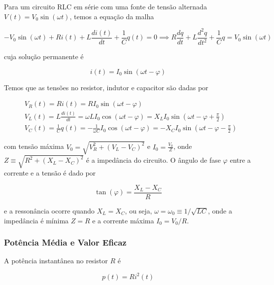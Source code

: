 \documentclass[12pt]{article}
\begin{document}
Para um circuito RLC em série com uma fonte de tensão alternada \(V(t) = V_0 \sin(\omega t)\), temos a equação da malha

\begin{equation}
    - V_0 \sin(\omega t) + R i(t) + L \frac{di(t)}{dt} + \frac{1}{C} q(t) = 0 \implies R\frac{dq}{dt} + L \frac{d^2q}{dt^2} + \frac{1}{C} q = V_0 \sin(\omega t)
\end{equation}

\noindent cuja solução permanente é

\begin{equation}
    \boxed{i(t) = I_0 \sin(\omega t - \varphi)}
\end{equation}

Temos que as tensões no resistor, indutor e capacitor são dadas por

\begin{align}
    &V_R(t) = R i(t) = R I_0 \sin(\omega t - \varphi) \\
    &V_L(t) = L \frac{di(t)}{dt} = \omega L I_0 \cos(\omega t - \varphi) = X_L I_0 \sin\left(\omega t - \varphi + \frac{\pi}{2}\right) \\
    &V_C(t) = \frac{1}{C} q(t) = -\frac{1}{\omega C} I_0 \cos(\omega t - \varphi) = -X_C I_0 \sin\left(\omega t - \varphi - \frac{\pi}{2}\right)
\end{align}

\noindent com tensão máxima \(\displaystyle V_0 = \sqrt{V_R^2 + (V_L - V_C)^2}\) e \(\displaystyle I_0 = \frac{V_0}{Z}\), onde \(Z \equiv \sqrt{R^2 + (X_L - X_C)^2}\) é a impedância do circuito. O ângulo de fase \(\varphi\) entre a corrente e a tensão é dado por

\begin{equation}
    \tan(\varphi) = \frac{X_L - X_C}{R}
\end{equation}

\noindent e a ressonância ocorre quando \(X_L = X_C\), ou seja, \(\omega = \omega_0 \equiv 1/\sqrt{LC}\), onde a impedância é mínima \(Z = R\) e a corrente máxima \(I_0 = V_0/R\).

\subsubsection{Potência Média e Valor Eficaz}

A potência instantânea no resistor \(R\) é

\begin{equation}
    p(t) = Ri^2(t)
\end{equation}
\end{document}
